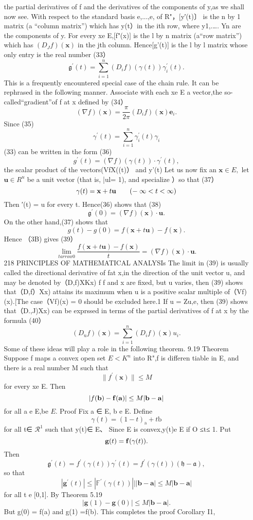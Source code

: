 the partial derivatives of f and the derivatives of the components of y,as we shall now see. With respect to the standard basis {e,...,e,} of R"，[y′(t)〕 is the n by 1 matrix (a “column matrix”) which has y(t）in the ith row, where y1,.…. Yn are the components of y. For every xe E,[f"(x)] is the l by n matrix (a“row matrix”) which has $(D_{J}f)(\mathbf{x})$ in the jth column. Hence[g'(t)] is the l by l matrix whose only entry is the real number (33） $$ {\mathfrak{g}}^{\prime}(t)=\sum_{i=1}^{n}(D_{i}f)(\gamma(t))\gamma_{i}^{\prime}(t). $$ This is a frequently encountered special case of the chain rule. It can be rephrased in the following manner. Associate with each xe E a vector,the so-called“gradient”of f at x defined by (34） $$ (\nabla f)(\mathbf{x})=\textstyle{\frac{\pi}{2\pi}}(D_{i}f)(\mathbf{x})\mathbf{e}_{i}. $$ Since (35) $$ \gamma^{\prime}(t)=\sum_{i=1}^{n}\gamma_{i}^{\prime}(t)\mathrm{}\mathrm{}\mathrm{}\mathrm{}\gamma_{i} $$ (33) can be written in the form (36) $$ g^{\prime}(t)=(\nabla f)(\gamma(t))\cdot\gamma^{\prime}(t), $$ the scalar product of the vectors(VfX((t)） and y'(t) Let us now fix an $\mathbf{x}\in E,$ let $\mathbf{u}\in R^{u}$ be a unit vector (that is, |ul= 1), and specialize ）so that (37） $$ \gamma(t)={\bf x}+t{\bf u}\qquad(-\;\infty<t<\infty) $$ Then ′(t) = u for every t. Hence(36) shows that (38) $$ {\mathfrak{g}}^{\prime}(0)=(\nabla f)(\mathbf{x})\cdot\mathbf{u}. $$ On the other hand,(37) shows that $$ g(t)-g(0)=f(\mathbf{x}+t\mathbf{u})-f(\mathbf{x}). $$ Hence （3B) gives (39） $$ \operatorname*{lim}_{t arrow0}{\frac{f(\mathbf{x}+t\mathbf{u})-f(\mathbf{x})}{t}}=(\nabla f)\left(\mathbf{x}\right)\cdot\mathbf{u}. $$218 PRINCIPLES OF MATHEMATICAL ANALYSIs The limit in (39) is usually called the directional derivative of fat x,in the direction of the unit vector u, and may be denoted by（D,f)XKx) f f and x are fixed, but u varies, then (39) shows that（D,f）Xx) attains its maximum when u is a positive scalar multiple of（Vf)(x).[The case（Vf)(x) = 0 should be excluded here.1 If u = Zu,e, then (39) shows that（D.,J)Xx) can be exprssed in terms of the partial derivatives of f at x by the formula (40） $$ (D_{\mathrm{u}}f)(\mathbf{x})=\sum_{i=1}^{n}(D_{i}f)(\mathbf{x})u_{i}. $$ Some of these ideas will play a role in the following theorem. 9.19 Theorem Suppose f maps a convex open set $E<K^{n}$ into R",f is differen tiable in E, and there is a real number M such that $$ \|f^{\prime}(\mathbf{x})\|\leq M $$ for every xe E. Then $$ |f({\bf b})-{\bf f}({\bf a})|\leq M|{\bf b}-{\bf a}| $$ for all a e E,be $\textstyle E.$ Proof Fix a ∈ E, b e E. Define $$ \gamma(t)=(1-t)_{\mathrm{a}}+t{\mathrm{b}} $$ for all t∈ $\textstyle{\mathcal{R}}^{1}$ such that y(t)∈ E、 Since E is convex,y(t)e E if O ≤t≤ 1. Put $$ \mathbf{g}(t)={\bf f}(\gamma(t)). $$ Then $$ {\mathfrak{g}}^{\prime}(t)=f^{\prime}(\gamma(t))\gamma^{\prime}(t)=f^{\prime}(\gamma(t))({\mathfrak{h}}-{\mathfrak{a}}), $$ so that $$ \left|\mathbf{g}^{\prime}(t)\right|\leq\left|\mathbb{F}^{\prime}(\gamma(t))\right|\left|\left|\mathbf{b}-\mathbf{a}\right|\leq M |\mathbf{b}-\mathbf{a}\right| $$ for all t e [0,1]. By Theorem 5.19 $$ |\mathbf{g}(1)-\mathbf{g}(0)|\leq M|\mathbf{b}-\mathbf{a}|. $$ But g(0) = f(a) and g(1) =f(b). This completes the proof Corollary I1, 